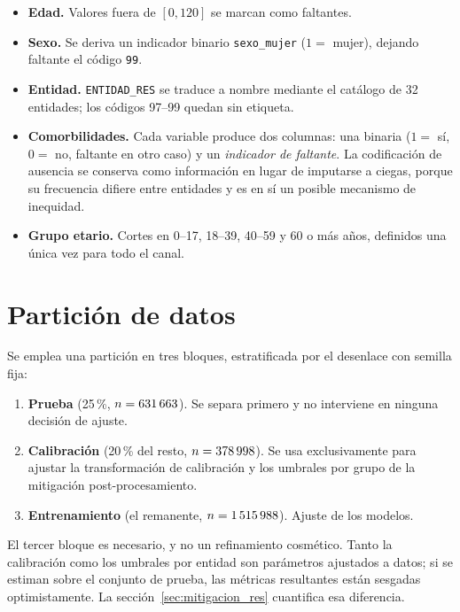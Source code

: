 \begin{itemize}[leftmargin=*]
  \item \textbf{Edad.} Valores fuera de $[0,120]$ se marcan como faltantes.
  \item \textbf{Sexo.} Se deriva un indicador binario \texttt{sexo\_mujer}
    ($1=$ mujer), dejando faltante el código \texttt{99}.
  \item \textbf{Entidad.} \texttt{ENTIDAD\_RES} se traduce a nombre mediante el
    catálogo de 32 entidades; los códigos 97--99 quedan sin etiqueta.
  \item \textbf{Comorbilidades.} Cada variable produce dos columnas: una binaria
    ($1=$ sí, $0=$ no, faltante en otro caso) y un \emph{indicador de faltante}.
    La codificación de ausencia se conserva como información en lugar de
    imputarse a ciegas, porque su frecuencia difiere entre entidades y es en sí
    un posible mecanismo de inequidad.
  \item \textbf{Grupo etario.} Cortes en 0--17, 18--39, 40--59 y 60 o más años,
    definidos una única vez para todo el canal.
\end{itemize}

\section{Partición de datos}
\label{sec:particion}

Se emplea una partición en tres bloques, estratificada por el desenlace con
semilla fija:

\begin{enumerate}[leftmargin=*]
  \item \textbf{Prueba} (25\,\%, $n=631\,663$). Se separa primero y no interviene en
    ninguna decisión de ajuste.
  \item \textbf{Calibración} (20\,\% del resto, $n=378\,998$). Se usa exclusivamente para
    ajustar la transformación de calibración y los umbrales por grupo de la
    mitigación post-procesamiento.
  \item \textbf{Entrenamiento} (el remanente, $n=1\,515\,988$). Ajuste de los modelos.
\end{enumerate}

El tercer bloque es necesario, y no un refinamiento cosmético. Tanto la
calibración como los umbrales por entidad son parámetros ajustados a datos; si se
estiman sobre el conjunto de prueba, las métricas resultantes están sesgadas
optimistamente. La sección~\ref{sec:mitigacion_res} cuantifica esa diferencia.

